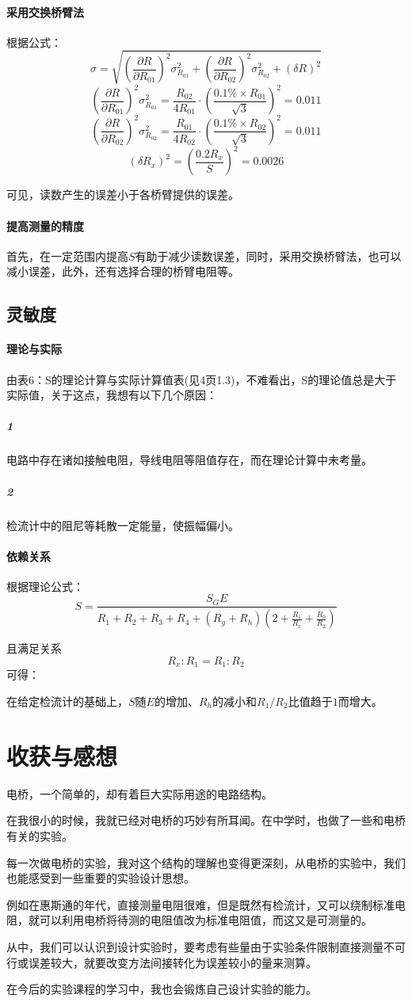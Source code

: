 \documentclass{ctexart}
\begin{document}
\paragraph{采用交换桥臂法}

根据公式：
$$\sigma=\sqrt{(\frac{\partial R}{\partial R_{01}})^2\sigma_{R_{01}}^2+(\frac{\partial R}{\partial R_{02}})^2\sigma_{R_{02}}^2+(\delta R)^2}$$
$$(\frac{\partial R}{\partial R_{01}})^2\sigma_{R_{01}}^2=\frac{R_{02}}{4R_{01}}\cdot (\frac{0.1\% \times R_{01}}{\sqrt{3}})^2=0.011$$
$$(\frac{\partial R}{\partial R_{02}})^2\sigma_{R_{02}}^2=\frac{R_{01}}{4R_{02}}\cdot (\frac{0.1\% \times R_{02}}{\sqrt{3}})^2=0.011$$
$$(\delta R_x)^2=(\frac{0.2R_x}{S})^2=0.0026$$

可见，读数产生的误差小于各桥臂提供的误差。

\paragraph{提高测量的精度}

首先，在一定范围内提高$S$有助于减少读数误差，同时，采用交换桥臂法，也可以减小误差，此外，还有选择合理的桥臂电阻等。

\subsection{灵敏度}
\paragraph{理论与实际}
由表6：S的理论计算与实际计算值表(见4页1.3)，不难看出，S的理论值总是大于实际值，关于这点，我想有以下几个原因：
\subparagraph{1}电路中存在诸如接触电阻，导线电阻等阻值存在，而在理论计算中未考量。
\subparagraph{2}检流计中的阻尼等耗散一定能量，使振幅偏小。
\paragraph{依赖关系}
根据理论公式：$$S=\frac{S_GE}{R_1+R_2+R_3+R_4+(R_g+R_h)(2+\frac{R_1}{R_x}+\frac{R_0}{R_2})}$$

且满足关系$$R_x:R_1=R_1:R_2$$可得：

在给定检流计的基础上，$S$随$E的增加$、$R_h的减小$和$R_1/R_2比值趋于1$而增大。

\section{收获与感想}
电桥，一个简单的，却有着巨大实际用途的电路结构。

在我很小的时候，我就已经对电桥的巧妙有所耳闻。在中学时，也做了一些和电桥有关的实验。

每一次做电桥的实验，我对这个结构的理解也变得更深刻，从电桥的实验中，我们也能感受到一些重要的实验设计思想。

例如在惠斯通的年代，直接测量电阻很难，但是既然有检流计，又可以绕制标准电阻，就可以利用电桥将待测的电阻值改为标准电阻值，而这又是可测量的。

从中，我们可以认识到设计实验时，要考虑有些量由于实验条件限制直接测量不可行或误差较大，就要改变方法间接转化为误差较小的量来测算。

在今后的实验课程的学习中，我也会锻炼自己设计实验的能力。
\end{document}
